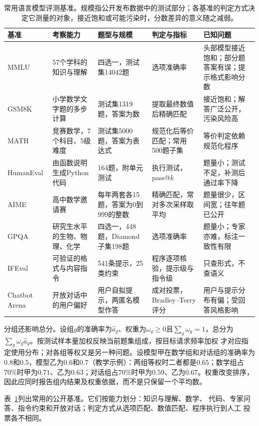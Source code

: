 \begin{table}[t]
 \begin{tabularx}{\linewidth}{@{}p{22mm}p{28mm}p{36mm}p{32mm}X@{}}
  \toprule
  基准 & 考察能力 & 题型与规模 & 判定与指标 & 已知问题\\
  \midrule
  MMLU & 57个学科的知识与理解 & 四选一，测试集14042题 & 选项准确率 & 头部模型接近饱和；部分题答案有误；提示格式影响分数\\
  GSM8K & 小学数学文字题的多步计算 & 测试集1319题，答案为数 & 提取最终数值后精确匹配 & 接近饱和；解答广泛公开，污染风险高\\
  MATH & 竞赛数学，7个科目、5级难度 & 测试集5000题，答案为表达式 & 规范化后等价匹配；常用500题子集 & 等价判定依赖规范化程序\\
  HumanEval & 由函数说明生成Python代码 & 164题，附单元测试 & 执行测试，pass@$k$ & 题量小；测试不足，补测后通过率下降\\
  AIME & 高中数学邀请赛 & 每年两套各15题，答案为0到999的整数 & 精确匹配，常对多次采样取平均 & 题量很少，区间宽；往年题已公开\\
  GPQA & 研究生水平的生物、物理、化学 & 四选一，448题，Diamond子集198题 & 选项准确率 & 题量小；专家亦难，标注一致性有限\\
  IFEval & 可验证的格式与内容指令 & 541条提示，25类约束 & 程序逐项核验，提示级与指令级 & 只查形式，不查语义\\
  Chatbot Arena & 开放对话中的用户偏好 & 用户自拟提示，两匿名模型作答 & 成对投票，Bradley--Terry评分 & 用户与提示分布有偏；受回答风格影响\\
  \bottomrule
 \end{tabularx}
 \caption{常用语言模型评测基准。规模指公开发布数据中的测试部分；各基准的判定方式决定它测量的对象，接近饱和或可能污染时，分数差异的意义随之减弱。}
 \label{tab:nlp-eval-benchmarks}
\end{table}

分组还影响总分。设组$g$的准确率为$\widehat a_g$、权重为$\omega_g\geq0$且$\sum_g\omega_g=1$，总分为
$\sum_g\omega_g\widehat a_g$。按测试样本量加权反映当前题集组成，按目标请求频率加权
才对应指定使用分布；对各组等权又是另一种问题。设模型甲在数学组和对话组的准确率为
$0.8$和$0.5$，模型乙为$0.6$和$0.7$（教学示例）：两组等权时二者都是$0.65$；数学组占
$70\%$时甲为$0.71$、乙为$0.63$；对话组占$70\%$时甲为$0.59$、乙为$0.67$。权重改变排序，
因此应同时报告组内结果及权重依据，而不是只保留一个平均数。

表~\ref{tab:nlp-eval-benchmarks}列出常用的公开基准。它们按能力划分：知识与理解、数学、
代码、专家问答、指令约束和开放对话；判定方式从选项匹配、数值匹配、程序执行到人工
投票各不相同。

